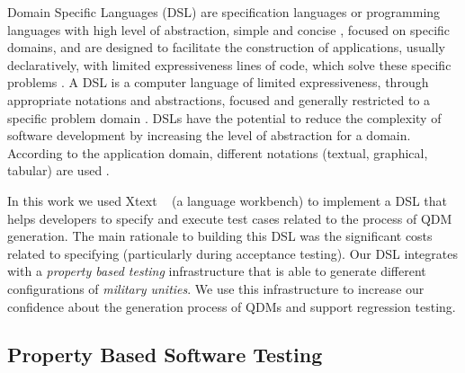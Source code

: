 Domain Specific Languages (DSL) are specification languages or programming languages with high level of abstraction, simple and concise \cite{raja2010}, focused on specific domains, and are designed to facilitate the construction of applications, usually declaratively, with limited expressiveness lines of code, which solve these specific problems \cite{neeraj2017}. A DSL is a computer language of limited expressiveness, through appropriate notations and abstractions, focused and generally restricted to a specific problem domain \cite{fowler2013,vanDeursen2000}. DSLs have the potential to reduce the complexity of software development by increasing the level of abstraction for a domain. According to the application domain, different notations (textual, graphical, tabular) are used \cite{pfeiffer2008}.


In this work we used Xtext ~\cite{eysholdt2010} (a language workbench) to implement a DSL that helps developers to specify and execute test cases related to the process of QDM generation. The main rationale to building this DSL was the significant costs related to specifying \callers (particularly during acceptance testing).
Our DSL integrates with a \emph{property based testing} infrastructure that
is able to generate different configurations of \emph{military unities}. We use
this infrastructure to increase our confidence about the generation process of
QDMs and support regression testing.


\subsection{Property Based Software Testing}
\label{sec:test}


